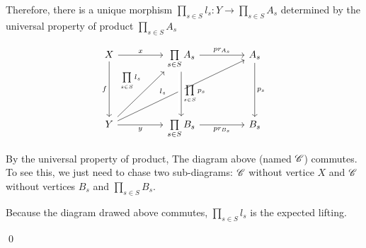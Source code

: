\begin{prf}
            \par Therefore, there is a unique morphism $\prod\limits_{s \in S} l_s : Y \to \prod\limits_{s \in S} A_s$
            determined by the universal property of product $\prod\limits_{s \in S} A_s$

            \[\begin{tikzcd}[row sep = 1.6cm, column sep = 1.6cm]
                X & {\prod\limits_{s \in S} A_s} & {A_s} \\
                Y & {\prod\limits_{s \in S} B_s} & {B_s}
                \arrow["{pr_{A_s}}", from=1-2, to=1-3]
                \arrow["{pr_{B_s}}"', from=2-2, to=2-3]
                \arrow["{p_s}", from=1-3, to=2-3]
                \arrow["x", from=1-1, to=1-2]
                \arrow["y"', from=2-1, to=2-2]
                \arrow["f"', from=1-1, to=2-1]
                \arrow["{l_s}"{pos = 0.4}, from=2-1, to=1-3]
                \arrow["{\prod\limits_{s\in S} p_s}", from=1-2, to=2-2, crossing over]
                \arrow["{\prod\limits_{s\in S} l_s}"{pos = 0.55}, from=2-1, to=1-2]
            \end{tikzcd}\]

            \par By the universal property of product, The diagram above (named $\mathscr{C}$) commutes.
            To see this, we just need to chase two sub-diagrams:
            $\mathscr{C}$ without vertice $X$ and $\mathscr{C}$ without vertices $B_s$ and ${\prod\limits_{s \in S} B_s}$.
            \par Because the diagram drawed above commutes, ${\prod\limits_{s\in S} l_s}$ is the expected lifting.

        \qed
        
        \end{prf}

